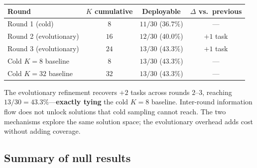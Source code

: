 \documentclass[11pt]{amsart}
\newcommand\1{{\mathds{1}}}
\theoremstyle{definition}
\theoremstyle{remark}
\numberwithin{equation}{section}
\begin{document}
\begin{center}\small
\begin{tabular}{lccc}
\toprule
Round & $K$ cumulative & Deployable & $\Delta$ vs.\ previous \\
\midrule
Round 1 (cold) & $8$ & $11/30$ ($36.7\%$) & --- \\
Round 2 (evolutionary) & $16$ & $12/30$ ($40.0\%$) & $+1$ task \\
Round 3 (evolutionary) & $24$ & $13/30$ ($43.3\%$) & $+1$ task \\
\midrule
Cold $K\!=\!8$ baseline & $8$ & $13/30$ ($43.3\%$) & --- \\
Cold $K\!=\!32$ baseline & $32$ & $13/30$ ($43.3\%$) & --- \\
\bottomrule
\end{tabular}
\end{center}

The evolutionary refinement recovers $+2$ tasks across rounds $2$--$3$, reaching $13/30 = 43.3\%$---\textbf{exactly tying} the cold $K\!=\!8$ baseline.
Inter-round information flow does not unlock solutions that cold sampling cannot reach.
The two mechanisms explore the same solution space; the evolutionary overhead adds cost without adding coverage.

\subsection{Summary of null results}\label{sec:act2-six-nulls}
\end{document}
